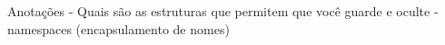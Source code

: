 Anotações
- Quais são as estruturas que permitem que você guarde e oculte
- namespaces (encapsulamento de nomes)
